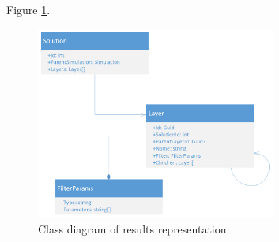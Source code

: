 

Figure \ref{fig:results-class-diagram}.

\begin{figure}[H]
    \centering
    \includegraphics[width=0.7\textwidth]{figures/results-class-diagram}
    \decoRule
    \caption{Class diagram of results representation}
    \label{fig:results-class-diagram}
\end{figure}